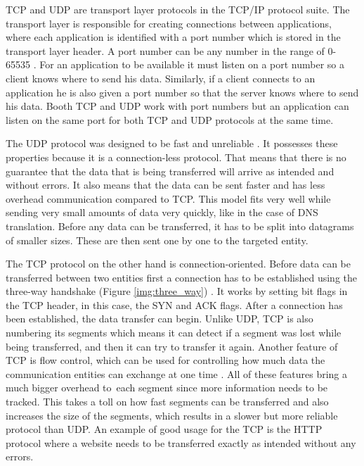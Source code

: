 TCP and UDP are transport layer protocols in the TCP/IP protocol suite. The transport layer is responsible for creating connections between applications, where each application is identified with a port number which is stored in the transport layer header. A port number can be any number in the range of 0-65535 \cite{Forouzan2010}. For an application to be available it must listen on a port number so a client knows where to send his data. Similarly, if a client connects to an application he is also given a port number so that the server knows where to send his data. Booth TCP and UDP work with port numbers but an application can listen on the same port for both TCP and UDP protocols at the same time.

The UDP protocol was designed to be fast and unreliable \cite{Forouzan2010}. It possesses these properties because it is a connection-less protocol. That means that there is no guarantee that the data that is being transferred will arrive as intended and without errors. It also means that the data can be sent faster and has less overhead communication compared to TCP. This model fits very well while sending very small amounts of data very quickly, like in the case of DNS translation. Before any data can be transferred, it has to be split into datagrams of smaller sizes. These are then sent one by one to the targeted entity.

The TCP protocol on the other hand is connection-oriented. Before data can be transferred between two entities first a connection has to be established using the three-way handshake (Figure \ref{img:three_way}) \cite{Forouzan2010}. It works by setting bit flags in the TCP header, in this case, the SYN and ACK flags. After a connection has been established, the data transfer can begin. Unlike UDP, TCP is also numbering its segments which means it can detect if a segment was lost while being transferred, and then it can try to transfer it again. Another feature of TCP is flow control, which can be used for controlling how much data the communication entities can exchange at one time \cite{Forouzan2010}. All of these features bring a much bigger overhead to~each segment since more information needs to be tracked. This takes a toll on how fast segments can be transferred and also increases the size of the segments, which results in a slower but more reliable protocol than UDP. An example of good usage for the TCP is the HTTP protocol where a website needs to be transferred exactly as intended without any errors.

